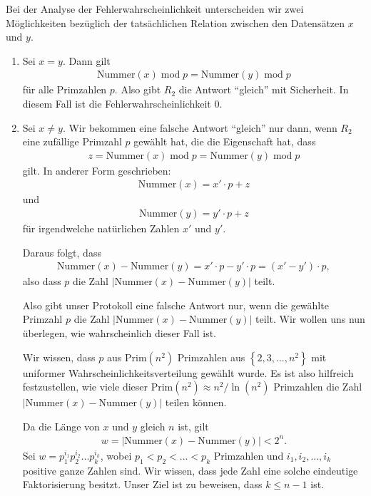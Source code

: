 Bei der Analyse der Fehlerwahrscheinlichkeit unterscheiden wir zwei Möglichkeiten bezüglich der tatsächlichen Relation zwischen den Datensätzen $x$ und $y$.
\begin{enumerate}
    \item Sei $x = y$. Dann gilt
    \begin{align*}
        \text{Nummer}(x)\; \text{mod} \; p = \text{Nummer}(y)\; \text{mod} \; p
    \end{align*}
    für alle Primzahlen $p$. Also gibt $R_2$ die Antwort ``gleich'' mit Sicherheit. In diesem Fall ist die Fehlerwahrscheinlichkeit $0$.
    \item Sei $x\neq y$. Wir bekommen eine falsche Antwort ``gleich'' nur dann, wenn $R_2$ eine zufällige Primzahl $p$ gewählt hat, die die Eigenschaft hat, dass
    \begin{align*}
        z = \text{Nummer}(x)\; \text{mod} \; p = \text{Nummer}(y)\; \text{mod} \; p
    \end{align*}
    gilt. In anderer Form geschrieben:
    \begin{align*}
        \text{Nummer}(x) = x'\cdot p + z
    \end{align*}
    und
    \begin{align*}
        \text{Nummer}(y) = y'\cdot p + z
    \end{align*}
    für irgendwelche natürlichen Zahlen $x'$ und $y'$.
    
    Daraus folgt, dass
    \begin{align*}
        \text{Nummer}(x)-\text{Nummer}(y) = x'\cdot p -  y'\cdot p = (x'-y')\cdot p,
    \end{align*}
    also dass $p$ die Zahl $|\text{Nummer}(x)-\text{Nummer}(y)|$ teilt.
    
    Also gibt unser Protokoll eine falsche Antwort nur, wenn die gewählte Primzahl $p$ die Zahl $|\text{Nummer}(x)-\text{Nummer}(y)|$ teilt. Wir wollen uns nun überlegen, wie wahrscheinlich dieser Fall ist.
    
    Wir wissen, dass $p$ aus $\text{Prim}(n^2)$ Primzahlen aus $\left\{2,3,...,n^2\right\}$ mit uniformer Wahrscheinlichkeitsverteilung gewählt wurde. Es ist also hilfreich festzustellen, wie viele dieser $\text{Prim}(n^2)\approx n^2/\ln(n^2)$ Primzahlen die Zahl $|\text{Nummer}(x)-\text{Nummer}(y)|$ teilen können.
    
    Da die Länge von $x$ und $y$ gleich $n$ ist, gilt
    \begin{align*}
        w = |\text{Nummer}(x)-\text{Nummer}(y)| < 2^n.
    \end{align*}
    Sei $w = p_1^{i_1}p_2^{i_2}...p_k^{i_k}$, wobei $p_1<p_2<...<p_k$ Primzahlen  und $i_1, i_2,...,i_k$ positive ganze Zahlen sind. Wir wissen, dass jede Zahl eine solche eindeutige Faktorisierung besitzt. Unser Ziel ist zu beweisen, dass $k\leq n-1$ ist.
    

\end{enumerate}

